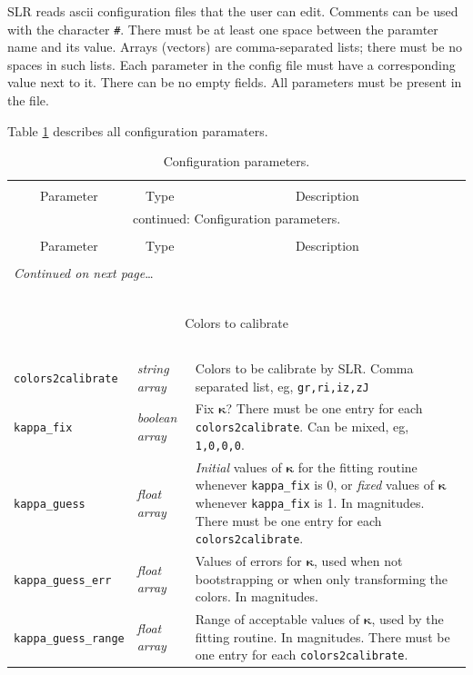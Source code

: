 \documentclass{report}
\newcommand{\zptcolor}{\boldsymbol{\kappa}}
\begin{document}
SLR reads ascii configuration files that the user can edit.  Comments
can be used with the character \verb|#|.  There must be at least one
space between the paramter name and its value.  Arrays (vectors) are
comma-separated lists; there must be no spaces in such lists.  Each
parameter in the config file must have a corresponding value next to
it.  There can be no empty fields.  All parameters must be present in
the file.

Table \ref{tab:config} describes all configuration paramaters.

\begin{center}
\begin{longtable}{llp{2in}}
\caption[Configuration parameters.]{Configuration parameters.}
\label{tab:config} \\
  \hline \hline \\[-2ex]
  \multicolumn{1}{c}{Parameter} &
  \multicolumn{1}{c}{Type} &
  \multicolumn{1}{c}{Description} \\[0.5ex] \hline
\endfirsthead
\multicolumn{3}{c}{{\tablename} \thetable{} continued: Configuration parameters.} \\[0.5ex]
  \hline \hline \\[-2ex]
  \multicolumn{1}{c}{Parameter} &
  \multicolumn{1}{c}{Type} &
  \multicolumn{1}{c}{Description} 
\\[0.5ex] \hline
  \\[-1.8ex]
\endhead
\multicolumn{3}{l}{{{\it Continued on next page}\ldots}} \\
\endfoot
  \\[-1.8ex] \hline \hline
\endlastfoot

~ & ~ & ~ \\ \hline
\multicolumn{3}{c}{Colors to calibrate} \\
\hline ~ & ~ & ~ \\ 

\verb|colors2calibrate| & {\it string array} & Colors to be calibrate by SLR. Comma separated list, eg, \verb|gr,ri,iz,zJ| \\
\verb|kappa_fix| & {\it boolean array} & Fix $\zptcolor$? There must be one entry for each \verb|colors2calibrate|. Can be mixed, eg, \verb|1,0,0,0|. \\
\verb|kappa_guess| & {\it float array} & {\it Initial} values of $\zptcolor$ for the fitting routine whenever \verb|kappa_fix| is 0, or {\it fixed} values of $\mathbf{\kappa}$ whenever \verb|kappa_fix| is 1. In magnitudes. There must be one entry for each \verb|colors2calibrate|. \\
\verb|kappa_guess_err| & {\it float array} & Values of errors for $\zptcolor$, used when not bootstrapping or when only transforming the colors. In magnitudes. \\
\verb|kappa_guess_range| & {\it float array} & Range of acceptable values of $\zptcolor$, used by the fitting routine. In magnitudes. There must be one entry for each \verb|colors2calibrate|. \\


\end{longtable}
\end{center}
\end{document}
